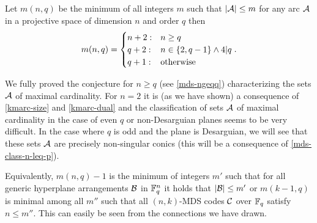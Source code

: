\begin{conjecture}
  Let $m(n,q)$ be the minimum of all integers $m$ such that $\left\vert{\mathcal{A}}\right\vert\leq m$ for any arc $\mathcal{A}$ in a projective space of dimension $n$ and order $q$ then
  $$
    m(n,q)=\begin{cases}
      n+2 :& n \geq q\\
      q+2 :& n\in\{2,q-1\} \wedge 4| q\\
      q+1 :& \textrm{otherwise}
    \end{cases}.
    $$
\end{conjecture}

\begin{remark}%
    We fully proved the conjecture for $n\geq q$ (see \autoref{mds-ngeqq}) characterizing the sets $\mathcal{A}$ of maximal cardinality. For $n=2$ it is (as we have shown) a consequence of \autoref{kmarc-size} and \autoref{kmarc-dual} and the classification of sets $\mathcal{A}$ of maximal cardinality in the case of even $q$ or non-Desarguian planes seems to be very difficult. In the case where $q$ is odd and the plane is Desarguian, we will see that these sets $\mathcal{A}$ are precisely non-singular conics (this will be a consequence of \autoref{mds-class-n-leq-p}). 
\end{remark}

\begin{remark}\label{mds-mainconjotherobj}
    Equivalently, $m(n,q)-1$ is the minimum of integers $m'$ such that for all generic hyperplane arrangements $\mathcal{B}$ in $\mathbb{F}_{q}^n$ it holds that $\left\vert{\mathcal{B}}\right\vert\leq m'$ or $m(k-1,q)$ is minimal among all $m''$ such that all $(n,k)$-MDS codes $\mathcal{C}$ over $\mathbb{F}_{q}$ satisfy $n\leq m''$. This can easily be seen from the connections we have drawn.
\end{remark}





